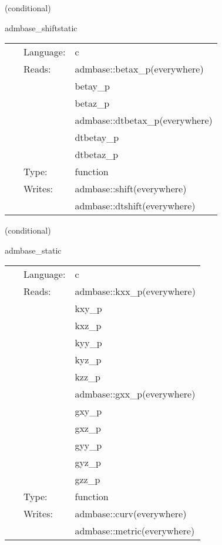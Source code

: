 \documentclass{article}
\begin{document}
\vspace{5mm}

   (conditional) 

\hspace{5mm} admbase\_shiftstatic 

\hspace{5mm}{\it copy the shift to the current time level } 


\hspace{5mm}

 \begin{tabular*}{160mm}{cll} 
~ & Language:  & c \\ 
~ & Reads:  & admbase::betax\_p(everywhere) \\ 
~& ~ &betay\_p\\ 
~& ~ &betaz\_p\\ 
~& ~ &admbase::dtbetax\_p(everywhere)\\ 
~& ~ &dtbetay\_p\\ 
~& ~ &dtbetaz\_p\\ 
~ & Type:  & function \\ 
~ & Writes:  & admbase::shift(everywhere) \\ 
~& ~ &admbase::dtshift(everywhere)\\ 
\end{tabular*} 


\vspace{5mm}

   (conditional) 

\hspace{5mm} admbase\_static 

\hspace{5mm}{\it copy the metric and extrinsic curvature to the current time level } 


\hspace{5mm}

 \begin{tabular*}{160mm}{cll} 
~ & Language:  & c \\ 
~ & Reads:  & admbase::kxx\_p(everywhere) \\ 
~& ~ &kxy\_p\\ 
~& ~ &kxz\_p\\ 
~& ~ &kyy\_p\\ 
~& ~ &kyz\_p\\ 
~& ~ &kzz\_p\\ 
~& ~ &admbase::gxx\_p(everywhere)\\ 
~& ~ &gxy\_p\\ 
~& ~ &gxz\_p\\ 
~& ~ &gyy\_p\\ 
~& ~ &gyz\_p\\ 
~& ~ &gzz\_p\\ 
~ & Type:  & function \\ 
~ & Writes:  & admbase::curv(everywhere) \\ 
~& ~ &admbase::metric(everywhere)\\ 
\end{tabular*} 
\end{document}
